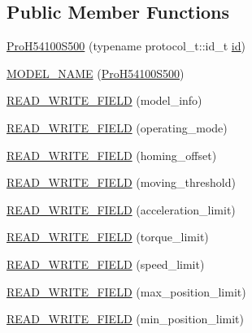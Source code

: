 \subsection*{Public Member Functions}
\begin{DoxyCompactItemize}
\item 
\hyperlink{classdynamixel_1_1servos_1_1_pro_h54100_s500_a99c69a3c500d355d2354516fe861792d}{Pro\+H54100\+S500} (typename protocol\+\_\+t\+::id\+\_\+t \hyperlink{classdynamixel_1_1servos_1_1_servo_a2d022081672e25a7bb57b76706e1cc57}{id})
\item 
\hyperlink{classdynamixel_1_1servos_1_1_pro_h54100_s500_a41724437d3a31f397c38e1c44492d309}{M\+O\+D\+E\+L\+\_\+\+N\+A\+M\+E} (\hyperlink{classdynamixel_1_1servos_1_1_pro_h54100_s500}{Pro\+H54100\+S500})
\item 
\hyperlink{classdynamixel_1_1servos_1_1_pro_h54100_s500_a0bfef329154d4c3f1dcc30319514ff58}{R\+E\+A\+D\+\_\+\+W\+R\+I\+T\+E\+\_\+\+F\+I\+E\+L\+D} (model\+\_\+info)
\item 
\hyperlink{classdynamixel_1_1servos_1_1_pro_h54100_s500_a4f98eef90bf4b7619265fed707a78447}{R\+E\+A\+D\+\_\+\+W\+R\+I\+T\+E\+\_\+\+F\+I\+E\+L\+D} (operating\+\_\+mode)
\item 
\hyperlink{classdynamixel_1_1servos_1_1_pro_h54100_s500_a569a209fea9d8eef2a3b773870962787}{R\+E\+A\+D\+\_\+\+W\+R\+I\+T\+E\+\_\+\+F\+I\+E\+L\+D} (homing\+\_\+offset)
\item 
\hyperlink{classdynamixel_1_1servos_1_1_pro_h54100_s500_af2bb27779b2bd5c2c9c4d7c5bf7bf86e}{R\+E\+A\+D\+\_\+\+W\+R\+I\+T\+E\+\_\+\+F\+I\+E\+L\+D} (moving\+\_\+threshold)
\item 
\hyperlink{classdynamixel_1_1servos_1_1_pro_h54100_s500_a00ce49f6231cf810cf5732d3ecb9ca85}{R\+E\+A\+D\+\_\+\+W\+R\+I\+T\+E\+\_\+\+F\+I\+E\+L\+D} (acceleration\+\_\+limit)
\item 
\hyperlink{classdynamixel_1_1servos_1_1_pro_h54100_s500_a72b5d9f4bbf375476c4ddeb6f084ff4c}{R\+E\+A\+D\+\_\+\+W\+R\+I\+T\+E\+\_\+\+F\+I\+E\+L\+D} (torque\+\_\+limit)
\item 
\hyperlink{classdynamixel_1_1servos_1_1_pro_h54100_s500_a166a0767d1dd7a52ca32b4c8a694e861}{R\+E\+A\+D\+\_\+\+W\+R\+I\+T\+E\+\_\+\+F\+I\+E\+L\+D} (speed\+\_\+limit)
\item 
\hyperlink{classdynamixel_1_1servos_1_1_pro_h54100_s500_aacd4a52c191d68be6c98f07a3cded511}{R\+E\+A\+D\+\_\+\+W\+R\+I\+T\+E\+\_\+\+F\+I\+E\+L\+D} (max\+\_\+position\+\_\+limit)
\item 
\hyperlink{classdynamixel_1_1servos_1_1_pro_h54100_s500_aed2a30272b6bc0fe835b9fdc3da8c7fc}{R\+E\+A\+D\+\_\+\+W\+R\+I\+T\+E\+\_\+\+F\+I\+E\+L\+D} (min\+\_\+position\+\_\+limit)

\end{DoxyCompactItemize}
